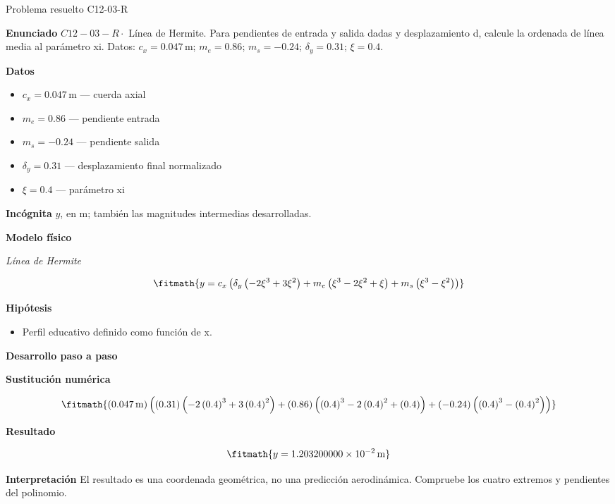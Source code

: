 \documentclass[10pt,openany]{book}
\begin{document}
\begin{studiumworked}{Problema resuelto C12-03-R}


\noindent\textbf{Enunciado}
\(C12-03-R \cdot\) Línea de Hermite. Para pendientes de entrada y salida dadas y desplazamiento d, calcule la ordenada de línea media al parámetro xi. Datos: \(c_x=0.047\, \mathrm{m}\); \(m_e=0.86\); \(m_s=-0.24\); \(\delta_y=0.31\); \(\xi=0.4\).

\noindent\textbf{Datos}
\begin{itemize}
\item $c_x = 0.047\,\mathrm{m}$ — cuerda axial
\item $m_e = 0.86$ — pendiente entrada
\item $m_s = -0.24$ — pendiente salida
\item $\delta_y = 0.31$ — desplazamiento final normalizado
\item $\xi = 0.4$ — parámetro xi
\end{itemize}

\noindent\textbf{Incógnita}
$y$, en $\mathrm{m}$; también las magnitudes intermedias desarrolladas.

\noindent\textbf{Modelo físico}

\noindent\textit{Línea de Hermite}

\[
\fitmath{y=c_x \left(\delta_y \left(- 2 \xi^{3} + 3 \xi^{2}\right) + m_e \left(\xi^{3} - 2 \xi^{2} + \xi\right) + m_s \left(\xi^{3} - \xi^{2}\right)\right)}
\]

\noindent\textbf{Hipótesis}
\begin{itemize}
\item Perfil educativo definido como función de x.
\end{itemize}

\noindent\textbf{Desarrollo paso a paso}



\noindent\textbf{Sustitución numérica}

\[
\fitmath{\left(0.047\,\mathrm{m}\right) \left(\left(0.31\right) \left(- 2 \left(0.4\right)^{3} + 3 \left(0.4\right)^{2}\right) + \left(0.86\right) \left(\left(0.4\right)^{3} - 2 \left(0.4\right)^{2} + \left(0.4\right)\right) + \left(-0.24\right) \left(\left(0.4\right)^{3} - \left(0.4\right)^{2}\right)\right)}
\]

\noindent\textbf{Resultado}

\[
\fitmath{y=1.203200000\times10^{-2}\,\mathrm{m}}
\]

\noindent\textbf{Interpretación}
El resultado es una coordenada geométrica, no una predicción aerodinámica. Compruebe los cuatro extremos y pendientes del polinomio.


\end{studiumworked}
\end{document}
